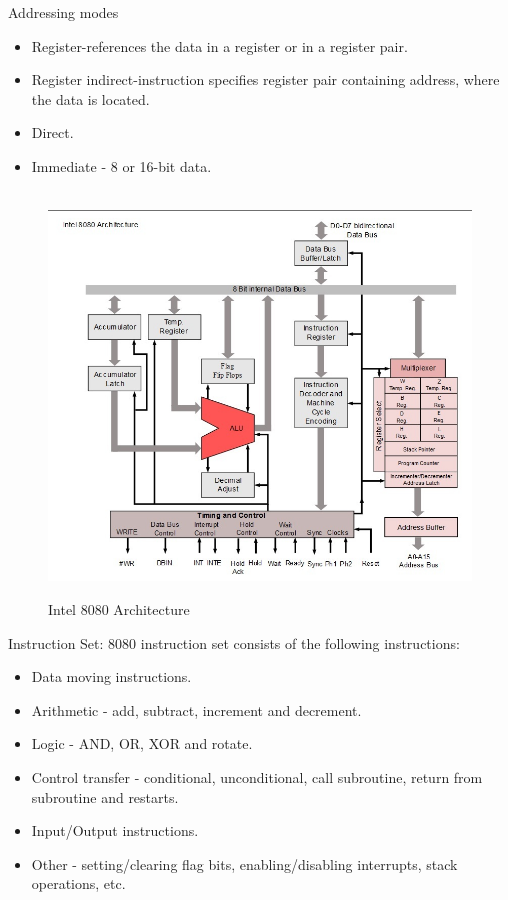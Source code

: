 \documentclass[conference]{IEEEtran}
\begin{document}
{\large \newpage Addressing modes}
\begin{itemize}



\item Register-references the data in a register or in a register pair.\\
\item Register indirect-instruction specifies register pair containing address, where the data is located.\\
\item Direct.\\
\item Immediate - 8 or 16-bit data.\\\\
\end{itemize}

\begin{figure}[!h]
\begin{center}
{\scalebox{0.7} {\includegraphics{8081.jpg}}}
\caption{Intel 8080 Architecture}
\end{center}
\end{figure}

{\newpage \large Instruction Set:}
 8080 instruction set consists of the following instructions:\\
\begin{itemize}

    \item Data moving instructions.
    \item Arithmetic - add, subtract, increment and decrement.
    \item Logic - AND, OR, XOR and rotate.
    \item Control transfer - conditional, unconditional, call subroutine, return from subroutine and restarts.
    \item Input/Output instructions.
    \item Other - setting/clearing flag bits, enabling/disabling interrupts, stack operations, etc.

    \end{itemize}
\newpage
\end{document}
